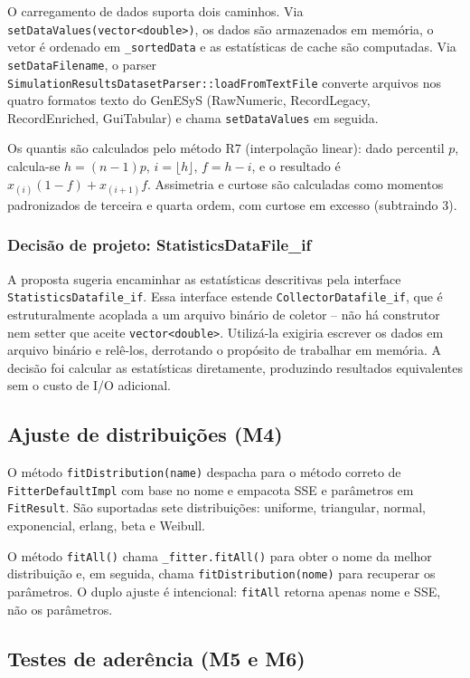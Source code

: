 O carregamento de dados suporta dois caminhos. Via \texttt{setDataValues(vector<double>)}, os dados são armazenados em memória, o vetor é ordenado em \texttt{\_sortedData} e as estatísticas de cache são computadas. Via \texttt{setDataFilename}, o parser \texttt{SimulationResultsDatasetParser::loadFromTextFile} converte arquivos nos quatro formatos texto do GenESyS (RawNumeric, RecordLegacy, RecordEnriched, GuiTabular) e chama \texttt{setDataValues} em seguida.

Os quantis são calculados pelo método R7 (interpolação linear): dado percentil $p$, calcula-se $h = (n-1)p$, $i = \lfloor h \rfloor$, $f = h - i$, e o resultado é $x_{(i)}(1-f) + x_{(i+1)}f$. Assimetria e curtose são calculadas como momentos padronizados de terceira e quarta ordem, com curtose em excesso (subtraindo 3).

\subsubsection*{Decisão de projeto: StatisticsDataFile\_if}

A proposta sugeria encaminhar as estatísticas descritivas pela interface \texttt{StatisticsDatafile\_if}. Essa interface estende \texttt{CollectorDatafile\_if}, que é estruturalmente acoplada a um arquivo binário de coletor -- não há construtor nem setter que aceite \texttt{vector<double>}. Utilizá-la exigiria escrever os dados em arquivo binário e relê-los, derrotando o propósito de trabalhar em memória. A decisão foi calcular as estatísticas diretamente, produzindo resultados equivalentes sem o custo de I/O adicional.

\subsection{Ajuste de distribuições (M4)}

O método \texttt{fitDistribution(name)} despacha para o método correto de \texttt{FitterDefaultImpl} com base no nome e empacota SSE e parâmetros em \texttt{FitResult}. São suportadas sete distribuições: uniforme, triangular, normal, exponencial, erlang, beta e Weibull.

O método \texttt{fitAll()} chama \texttt{\_fitter.fitAll()} para obter o nome da melhor distribuição e, em seguida, chama \texttt{fitDistribution(nome)} para recuperar os parâmetros. O duplo ajuste é intencional: \texttt{fitAll} retorna apenas nome e SSE, não os parâmetros.

\subsection{Testes de aderência (M5 e M6)}

